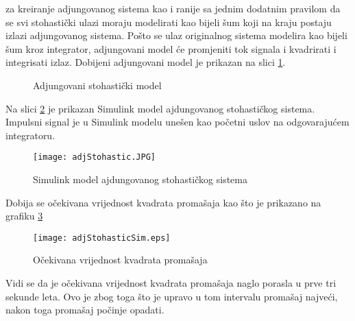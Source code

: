 za kreiranje adjungovanog sistema kao i ranije sa jednim dodatnim pravilom da se 
svi stohastički ulazi moraju modelirati kao bijeli šum koji na kraju postaju 
izlazi adjungovanog sistema. Pošto se ulaz originalnog sistema modelira kao bijeli šum 
kroz integrator, adjungovani model će promjeniti tok signala i kvadrirati i integrisati izlaz.
Dobijeni adjungovani model je prikazan na slici \ref{fig:adjStohastic}.
\begin{figure}[!ht]
    \centering

    \caption{Adjungovani stohastički model}
    \label{fig:adjStohastic}
\end{figure}
Na slici \ref{fig:adjStohasticSimm} je prikazan Simulink model ajdungovanog stohastičkog sistema. 
Impulsni signal je u Simulink modelu unešen kao početni uslov na odgovarajućem integratoru. 
\begin{figure}[!ht]
    \centering
    \texttt{[image: adjStohastic.JPG]}
    \caption{Simulink model ajdungovanog stohastičkog sistema}
    \label{fig:adjStohasticSimm}
\end{figure}
Dobija se očekivana vrijednost kvadrata promašaja kao što je prikazano na grafiku \ref{fig:stohGraf}
\begin{figure}[!ht]
    \centering
    \texttt{[image: adjStohasticSim.eps]}
    \caption{Očekivana vrijednost kvadrata promašaja}
    \label{fig:stohGraf}
\end{figure}
Vidi se da je očekivana vrijednost kvadrata promašaja naglo porasla u prve tri sekunde leta. 
Ovo je zbog toga što je upravo u tom intervalu promašaj najveći, nakon toga promašaj počinje opadati.



